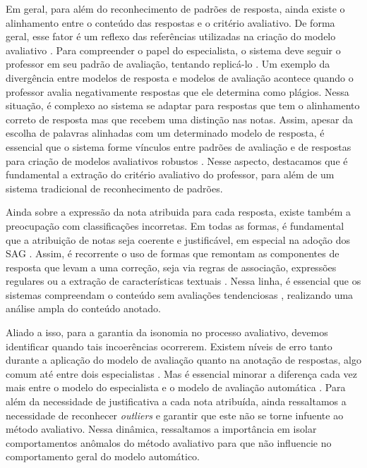 Em geral, para além do reconhecimento de padrões de resposta, ainda existe o alinhamento entre o conteúdo das respostas e o critério avaliativo. De forma geral, esse fator é um reflexo das referências utilizadas na criação do modelo avaliativo \cite{krithika2015}. Para compreender o papel do especialista, o sistema deve seguir o professor em seu padrão de avaliação, tentando replicá-lo \cite{jordan2012, funayama2020}. Um exemplo da divergência entre modelos de resposta e modelos de avaliação acontece quando o professor avalia negativamente respostas que ele determina como plágios. Nessa situação, é complexo ao sistema se adaptar para respostas que tem o alinhamento correto de resposta mas que recebem uma distinção nas notas. Assim, apesar da escolha de palavras alinhadas com um determinado modelo de resposta, é essencial que o sistema forme vínculos entre padrões de avaliação e de respostas para criação de modelos avaliativos robustos \cite{higgins2014}. Nesse aspecto, destacamos que é fundamental a extração do critério avaliativo do professor, para além de um sistema tradicional de reconhecimento de padrões.

Ainda sobre a expressão da nota atribuida para cada resposta, existe também a preocupação com classificações incorretas. Em todas as formas, é fundamental que a atribuição de notas seja coerente e justificável, em especial na adoção dos SAG \cite{funayama2020}. Assim, é recorrente o uso de formas que remontam as componentes de resposta que levam a uma correção, seja via regras de associação, expressões regulares ou a extração de características textuais \cite{chakraborty2017, kumar2019}. Nessa linha, é essencial que os sistemas compreendam o conteúdo sem avaliações tendenciosas \cite{azad2020}, realizando uma análise ampla do conteúdo anotado.

Aliado a isso, para a garantia da isonomia no processo avaliativo, devemos identificar quando tais incoerências ocorrerem. Existem níveis de erro tanto durante a aplicação do modelo de avaliação quanto na anotação de respostas, algo comum até entre dois especialistas \cite{artstein2008, pado2021}. Mas é essencial minorar a diferença cada vez mais entre o modelo do especialista e o modelo de avaliação automática \cite{condor2020}. Para além da necessidade de justificativa a cada nota atribuída, ainda ressaltamos a necessidade de reconhecer \textit{outliers} \cite{ding2020} e garantir que este não se torne infuente ao método avaliativo. Nessa dinâmica, ressaltamos a importância em isolar comportamentos anômalos do método avaliativo para que não influencie no comportamento geral do modelo automático.

